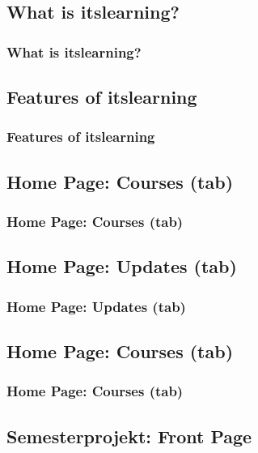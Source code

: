 \documentclass[t, aspectratio=169]{beamer}
\begin{document}
\subsection{What is itslearning?}
\begin{frame}[fragile]
  \frametitle{What is itslearning?}
  \vspace{1mm}
  
\end{frame}

\subsection{Features of itslearning}
\begin{frame}[fragile]
  \frametitle{Features of itslearning}
  \vspace{1mm}
  
\end{frame}

\subsection{Home Page: Courses (tab)}
\begin{frame}[fragile]
  \frametitle{Home Page: Courses (tab)}
  \vspace{1mm}
  
\end{frame}

\subsection{Home Page: Updates (tab)}
\begin{frame}[fragile]
  \frametitle{Home Page: Updates (tab)}
  \vspace{1mm}
  
\end{frame}

\subsection{Home Page: Courses (tab)}
\begin{frame}[fragile]
  \frametitle{Home Page: Courses (tab)}
  \vspace{1mm}
  
\end{frame}

\subsection{Semesterprojekt: Front Page}
\begin{frame}[fragile]
  \frametitle{}
  \vspace{1mm}
  
\end{frame}
\end{document}
